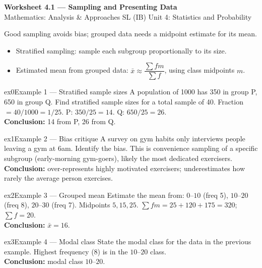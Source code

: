 \documentclass[11pt]{article}
\begin{document}
\begin{center}
{\LARGE\bfseries\color{titleblue}Worksheet 4.1 --- Sampling and Presenting Data}\\[2pt]
{\small Mathematics: Analysis \& Approaches SL (IB) \textperiodcentered{} Unit 4: Statistics and Probability}
\end{center}

\begin{ideabox}
Good sampling avoids bias; grouped data needs a midpoint estimate for its mean.
\begin{itemize}[leftmargin=*,itemsep=2pt]
  \item Stratified sampling: sample each subgroup proportionally to its size.
  \item Estimated mean from grouped data: $\bar x\approx\dfrac{\sum fm}{\sum f}$, using class midpoints $m$.
\end{itemize}
\end{ideabox}


\begin{example}{ex0}{Example 1 --- Stratified sample sizes}
A population of 1000 has 350 in group P, 650 in group Q. Find stratified sample sizes for a total sample of 40.\soln
Fraction $=40/1000=1/25$. P: $350/25=14$. Q: $650/25=26$.\\[3pt]\textbf{Conclusion:} 14 from P, 26 from Q.
\end{example}

\begin{example}{ex1}{Example 2 --- Bias critique}
A survey on gym habits only interviews people leaving a gym at 6am. Identify the bias.\soln
This is convenience sampling of a specific subgroup (early-morning gym-goers), likely the most dedicated exercisers.\\[3pt]\textbf{Conclusion:} over-represents highly motivated exercisers; underestimates how rarely the average person exercises.
\end{example}

\begin{example}{ex2}{Example 3 --- Grouped mean}
Estimate the mean from: $0$--$10$ (freq 5), $10$--$20$ (freq 8), $20$--$30$ (freq 7).\soln
Midpoints $5,15,25$. $\sum fm=25+120+175=320$; $\sum f=20$.\\[3pt]\textbf{Conclusion:} $\bar x=16$.
\end{example}

\begin{example}{ex3}{Example 4 --- Modal class}
State the modal class for the data in the previous example.\soln
Highest frequency (8) is in the $10$--$20$ class.\\[3pt]\textbf{Conclusion:} modal class $10$--$20$.
\end{example}
\end{document}
